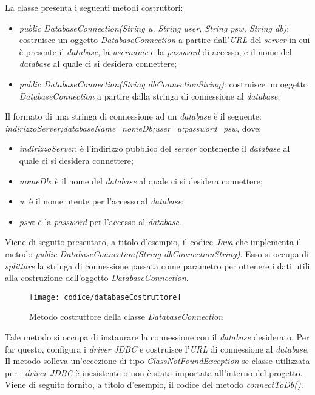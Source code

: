 \hspace{-15pt}La classe presenta i seguenti metodi costruttori:
\begin{itemize}
	\item \textit{public DatabaseConnection(String u, String user, String psw, String db)}: costruisce un oggetto \textit{DatabaseConnection} a partire dall'\textit{URL} del \textit{server} in cui è presente il \textit{database}, la \textit{username} e la \textit{password} di accesso, e il nome del \textit{database} al quale ci si desidera connettere;
	\item \textit{public DatabaseConnection(String dbConnectionString)}: costruisce un oggetto \textit{DatabaseConnection} a partire dalla stringa di connessione al \textit{database}.
\end{itemize}
Il formato di una stringa di connessione ad un \textit{database} è il seguente: \textit{indirizzoServer;databaseName=nomeDb;user=u;password=psw}, dove:
\begin{itemize}
	\item \textit{indirizzoServer}: è l'indirizzo pubblico del \textit{server} contenente il \textit{database} al quale ci si desidera connettere;
	\item \textit{nomeDb}: è il nome del \textit{database} al quale ci si desidera connettere;
	\item \textit{u}: è il nome utente per l'accesso al \textit{database};
	\item \textit{psw}: è la \textit{password} per l'accesso al \textit{database}.
\end{itemize}
Viene di seguito presentato, a titolo d'esempio, il codice \textit{Java} che implementa il metodo \textit{public DatabaseConnection(String dbConnectionString)}. Esso si occupa di \textit{splittare} la stringa di connessione passata come parametro per ottenere i dati utili alla costruzione dell'oggetto \textit{DatabaseConnection}.
\newpage
\begin{figure}[!h] 
    \centering 
    \texttt{[image: codice/databaseCostruttore]} 
    \caption{Metodo costruttore della classe \textit{DatabaseConnection}}
\end{figure}


Tale metodo si occupa di instaurare la connessione con il \textit{database} desiderato. Per far questo, configura i \textit{driver} \textit{JDBC} e costruisce l'\textit{URL} di connessione al \textit{database}. Il metodo solleva un'eccezione di tipo \textit{ClassNotFoundException} se classe utilizzata per i \textit{driver} \textit{JDBC} è inesistente o non è stata importata all'interno del progetto. Viene di seguito fornito, a titolo d'esempio, il codice del metodo \textit{connectToDb()}.

